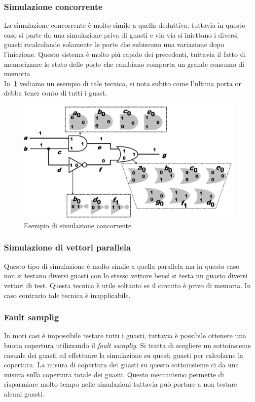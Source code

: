 \subsubsection{Simulazione concorrente}
La simulazione concorrente è molto simile a quella deduttiva, tuttavia in questo caso si parte da una simulazione priva di guasti e via via si iniettano i diversi guasti ricalcolando solamente le porte che subiscono una variazione dopo l'iniezione.
Questo sistema è molto più rapido dei precedenti, tuttavia il fatto di memorizzare lo stato delle porte che cambiano comporta un grande consumo di memoria.\\
In \figurename\,\ref{fig:concsim} vediamo un esempio di tale tecnica, si nota subito come l'ultima porta or debba tener conto di tutti i guast.
\begin{figure}
\centering
\includegraphics[scale=0.35]{img/concsim.png}
\caption{Esempio di simulazione concorrente}\label{fig:concsim}
\end{figure}
\subsubsection{Simulazione di vettori parallela}
Questo tipo di simulazione è molto simile a quella parallela ma in questo caso non si testano diversi guasti con lo stesso vettore bensì si testa un guasto diversi vettori di test. Questa tecnica è utile soltanto se il circuito è privo di memoria. In caso contrario tale tecnica è inapplicabile.
\subsubsection{Fault samplig}
In moti casi è impossibile testare tutti i guasti, tuttavia è possibile ottenere una buona copertura utilizzando il \emph{fault samplig}. Si tratta di scegliere un sottoinsieme casuale dei guasti ed effettuare la simulazione su questi guasti per calcolarne la copertura. La misura di copertura dei guasti su questo sottoinsieme ci da una misura sulla copertura totale dei guasti. Questo meccanismo permette di risparmiare molto tempo nelle simulazioni tuttavia può portare a non testare alcuni guasti.
